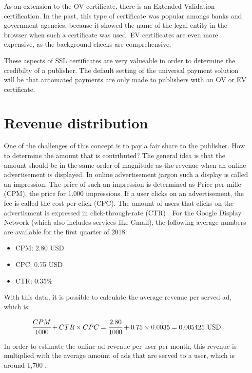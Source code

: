 As an extension to the OV certificate, there is an Extended Validation certification. In the past, this type of certificate was popular amongs banks and government agencies, because it showed the name of the legal entity in the browser when such a certificate was used. EV certificates are even more expensive, as the background checks are comprehensive.

These aspects of SSL certificates are very valueable in order to determine the credibilty of a publisher. The default setting of the universal payment solution will be that automated payments are only made to publishers with an OV or EV certificate.



\section{Revenue distribution}

One of the challenges of this concept is to pay a fair share to the publisher. How to determine the amount that is contributed? The general idea is that the amount should be in the same order of magnitude as the revenue when an online advertisement is displayed. In online advertisement jargon such a display is called an impression. The price of such an impression is determined as Price-per-mille (CPM), the price for 1,000 impressions. If a user clicks on an advertisement, the fee is called the cost-per-click (CPC). The amount of users that clicks on the advertisment is expressed in click-through-rate (CTR) \cite{evans2009online}. For the Google Display Network (which also includes services like Gmail), the following average numbers are available for the first quarter of 2018\cite{cpmgoogle}: 

\begin{itemize}
  \item CPM: 2.80 USD
  \item CPC: 0.75 USD
  \item CTR: 0.35\%
\end{itemize}

\noindent With this data, it is possible to calculate the average revenue per served ad, which is:

\begin{equation}
\cfrac{CPM}{1000} + CTR \times CPC = \cfrac{2.80}{1000} + 0.75 \times 0.0035 = 0.005425 ~\text{USD}
\end{equation}

\noindent In order to estimate the online ad revenue per user per month, this revenue is multiplied with the average amount of ads that are served to a user, which is around 1,700 \cite{papadopoulos2018cost}. 

